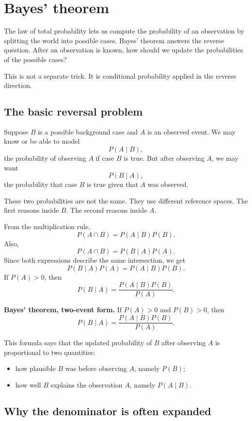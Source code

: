 \section{Bayes' theorem}

The law of total probability lets us compute the probability of an observation
by splitting the world into possible cases. Bayes' theorem answers the reverse
question. After an observation is known, how should we update the probabilities
of the possible cases?

This is not a separate trick. It is conditional probability applied in the
reverse direction.

\subsection*{The basic reversal problem}

Suppose \(B\) is a possible background case and \(A\) is an observed event. We
may know or be able to model
\[
P(A\mid B),
\]
the probability of observing \(A\) if case \(B\) is true. But after observing
\(A\), we may want
\[
P(B\mid A),
\]
the probability that case \(B\) is true given that \(A\) was observed.

These two probabilities are not the same. They use different reference spaces.
The first reasons inside \(B\). The second reasons inside \(A\).

From the multiplication rule,
\[
P(A\cap B)=P(A\mid B)P(B).
\]
Also,
\[
P(A\cap B)=P(B\mid A)P(A).
\]
Since both expressions describe the same intersection, we get
\[
P(B\mid A)P(A)=P(A\mid B)P(B).
\]
If \(P(A)>0\), then
\[
P(B\mid A)=\frac{P(A\mid B)P(B)}{P(A)}.
\]

\begin{theorembox}
\textbf{Bayes' theorem, two-event form.} If \(P(A)>0\) and \(P(B)>0\), then
\[
P(B\mid A)=\frac{P(A\mid B)P(B)}{P(A)}.
\]
\end{theorembox}

This formula says that the updated probability of \(B\) after observing \(A\) is
proportional to two quantities:
\begin{itemize}
    \item how plausible \(B\) was before observing \(A\), namely \(P(B)\);
    \item how well \(B\) explains the observation \(A\), namely \(P(A\mid B)\).
\end{itemize}

\subsection*{Why the denominator is often expanded}

